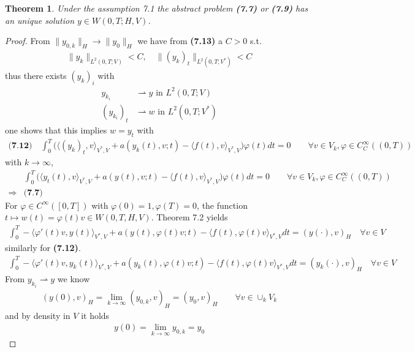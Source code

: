 \documentclass[a4paper,11pt,fleqn]{book}
\newtheorem{theorem}{Theorem}[section]
\theoremstyle{definition}
\theoremstyle{remark}
\begin{document}
\begin{theorem}
	Under the assumption 7.1 the abstract problem \textbf{(7.7)} or \textbf{(7.9)} has an unique solution $y \in W(0, T; H, V)$. 
\end{theorem}
\begin{proof}
	From $\|y_{0, k}\|_H \rightarrow \|y_0\|_H$ we have from \textbf{(7.13)} a $C > 0$ s.t.
	\begin{align*}
		\|y_k\|_{L^2(0, T;V)} < C, \quad \|(y_k)_t\|_{L^2(0, T; V^*)} < C
	\end{align*}
	thus there exists $(y_k)_i$ with 
	\begin{align*}
		y_{k_i} &\rightharpoonup y \text{ in } L^2(0, T; V)\\
		(y_{k_i})_t &\rightharpoonup w \text{ in } L^2(0, T; V^*)
	\end{align*}
	one shows that this implies $w = y_t$ with 
	\begin{align*}
	\textbf{(7.12)} \quad
		\int_0^T \bigg( \langle (y_k)_t, v \rangle_{V^*, V} + a(y_k(t), v ; t) - \langle f(t), v \rangle_{V^*, V}\bigg) \varphi(t) dt  = 0 \qquad \forall v \in V_k, \varphi \in C_C^\infty((0, T))
	\end{align*}
	with $k \rightarrow \infty$, 
	\begin{align*}
		&\int_0^T \bigg(\langle y_t(t), v\rangle_{V^*,V} + a(y(t), v; t) - \langle f(t), v \rangle_{V^*, V}\bigg) \varphi(t) dt = 0 
		\qquad \forall v \in V_k, \varphi \in C_C^\infty((0, T))\\
		\Rightarrow &\textbf{(7.7)}
	\end{align*}
	For $\varphi \in C^\infty([0, T])$ with $\varphi(0) = 1, \varphi(T) = 0$, the function $t \mapsto w(t) = \varphi(t) v \in W(0, T, H, V)$. Theorem 7.2 yields 
	\begin{align*}
		\int_0^T - \langle \varphi'(t)v, y(t)\rangle_{V^*, V} + a(y(t), \varphi(t) v ; t) - \langle f(t), \varphi(t)v \rangle_{V^*, V} dt = (y(\cdot), v)_H \quad \forall v \in V 
	\end{align*}
	similarly for \textbf{(7.12)}.
	\begin{align*}
		\int_0^T - \langle \varphi'(t)v, y_k(t)\rangle_{V^*, V} + a(y_k(t), \varphi(t) v ; t) - \langle f(t), \varphi(t)v \rangle_{V^*, V} dt = (y_k(\cdot), v)_H \quad \forall v \in V 	
	\end{align*}
	From $y_{k_i} \rightharpoonup y$ we know 
	\begin{align*}
		(y(0), v)_H = \lim_{k \rightarrow \infty} (y_{0, k}, v )_H = (y_0, v)_H \qquad \forall v \in \cup_k V_k
	\end{align*}
	and by density in $V$ it holds
	\begin{align*}
		y(0) = \lim_{k \rightarrow \infty} y_{0, k} = y_0
	\end{align*}
\end{proof}
\end{document}
